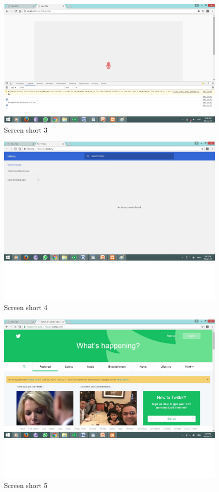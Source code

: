 \documentclass[11pt]{report} %
\begin{document}
\begin{figure}[ht]
	\centering
	\includegraphics[width=\linewidth]{figures/screen3.jpg}
	\caption{Screen short 3}
	\label{fig:Screen short 3}
\end{figure}

\begin{figure}[ht]
	\centering
	\includegraphics[width=\linewidth]{figures/screen4.jpg}
	\caption{Screen short 4}
	\label{fig:Screen short 4}
\end{figure}

\begin{figure}[ht]
	\centering
	\includegraphics[width=\linewidth]{figures/screen5.jpg}
	\caption{Screen short 5}
	\label{fig:Screen short 5}
\end{figure}


\nocite{HTTPWikipedia}
\nocite{javahttpsessionStackoverflow}


\end{document}
